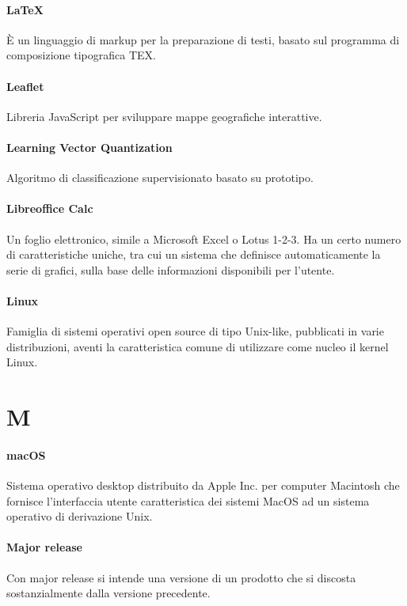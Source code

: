 \documentclass[]{article}
\begin{document}
	\paragraph*{LaTeX}
	È un linguaggio di markup per la preparazione di testi, basato sul programma di composizione tipografica TEX.
	
	\paragraph*{Leaflet}
	Libreria JavaScript per sviluppare mappe geografiche interattive.
	
	\paragraph*{Learning Vector Quantization}
	Algoritmo di classificazione supervisionato basato su prototipo.
	
	\paragraph*{Libreoffice Calc}
	Un foglio elettronico, simile a Microsoft Excel o Lotus 1-2-3. Ha un certo numero di caratteristiche uniche, tra cui un sistema che definisce automaticamente la serie di grafici, sulla base delle informazioni disponibili per l'utente.
	
	\paragraph*{Linux}
	Famiglia di sistemi operativi open source di tipo Unix-like, pubblicati in varie distribuzioni, aventi la caratteristica comune di utilizzare come nucleo il kernel Linux.
	
	\newpage
	
	\section*{M}
	
	\paragraph*{macOS}
	Sistema operativo desktop distribuito da Apple Inc. per	computer Macintosh che fornisce l'interfaccia utente caratteristica dei sistemi	MacOS ad un sistema operativo di derivazione Unix.
	
	\paragraph*{Major release}
	Con major release si intende una versione di un prodotto che si discosta sostanzialmente dalla versione precedente.
	
\end{document}
